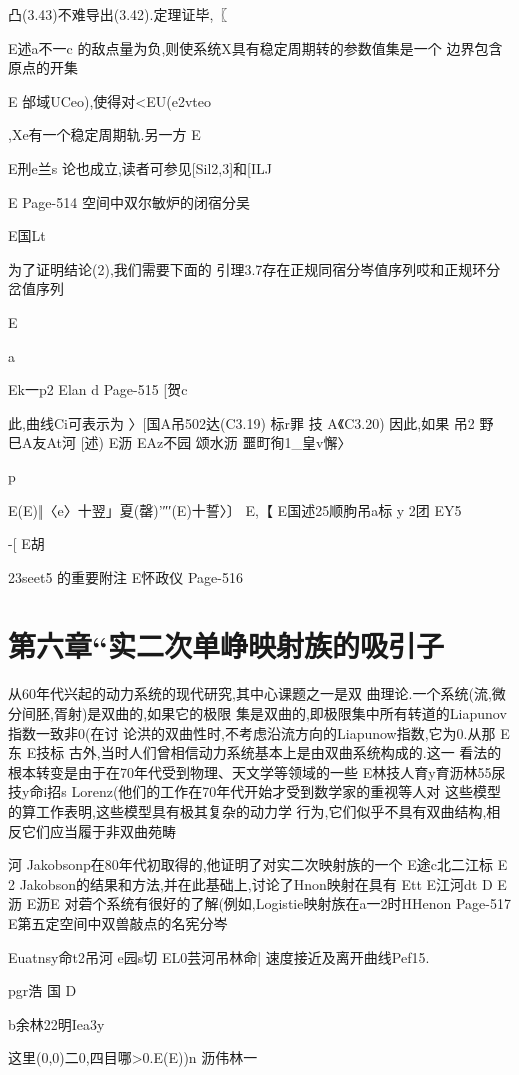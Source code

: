 {{{{{凸(3.43)不难导出(3.42).定理证毕,〖

E述a不一c
的敌点量为负,则使系统X具有稳定周期转的参数值集是一个
边界包含原点的开集

E
邰域UCeo),使得对<EU(e2vteo},Xe有一个稳定周期轨.另一方
E

E刑e兰s
论也成立,读者可参见[Sil2,3]和[ILJ

E
Page-514
空间中双尔敏炉的闭宿分吴

E国Lt

为了证明结论(2),我们需要下面的
引理3.7存在正规同宿分岑值序列哎和正规环分岔值序列

E

a

Ek一p2
Elan
d
Page-515
[贺c

此,曲线Ci可表示为
〉[国A吊502达(C3.19)
标r罪
技
A《C3.20)
因此,如果
吊2
野
巳A友At河
[述)
E沥
EAz不园
颂水沥
噩町徇1_皇v懈〉

p

E(E)‖〈e〉十翌」夏(罄)'″′(E)十誓〉〕
E,【
E国述25顺朐吊a标
y
2团
EY5

-[
E胡

23seet5
的重要附注
E怀政仪
Page-516

\part{第六章“实二次单峥映射族的吸引子}


从60年代兴起的动力系统的现代研究,其中心课题之一是双
曲理论.一个系统(流,微分间胚,胥射)是双曲的,如果它的极限
集是双曲的,即极限集中所有转道的Liapunov指数一致非0(在讨
论洪的双曲性时,不考虑沿流方向的Liapunow指数,它为0.从那
E东
E技标
古外,当时人们曾相信动力系统基本上是由双曲系统构成的.这一
看法的根本转变是由于在70年代受到物理、天文学等领域的一些
E林技人育y育沥林55尿技y命i招s
Lorenz(他们的工作在70年代开始才受到数学家的重视等人对
这些模型的算工作表明,这些模型具有极其复杂的动力学
行为,它们似乎不具有双曲结构,相反它们应当履于非双曲苑畴

河
Jakobsonp在80年代初取得的,他证明了对实二次映射族的一个
E途c北二江标
E
2
Jakobson的结果和方法,并在此基础上,讨论了Hnon映射在具有
Ett
E江河dt
D
E沥
E沥E
对菪个系统有很好的了解(例如,Logistie映射族在a一2时HHenon
Page-517
E第五定空间中双兽敲点的名宪分岑

Euatnsy命t2吊河
e园s切
EL0芸河吊林命|
速度接近及离开曲线Pef15.

pgr浩
国
D

b余林22明Iea3y

这里(0,0)二0,四目哪>0.E(E))n
沥伟林一

}}}}
